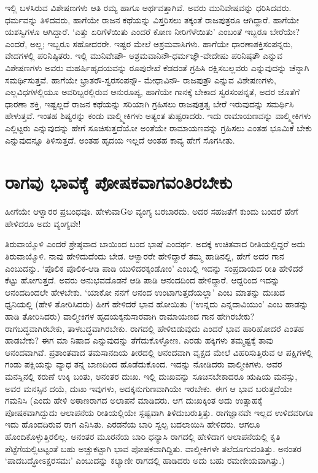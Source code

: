 ಇಲ್ಲಿ ಬಳಸಿರುವ ವಿಶೇಷಣಗಳು ಆತಿ ರಮ್ಯ ಹಾಗೂ ಅರ್ಥವತ್ತಾಗಿವೆ. ಅವರು ಮುನಿವೇಷವನ್ನು ಧರಿಸಿದವರು. ಧರ್ಮವನ್ನು ತಿಳಿದವರು, ಹಾಗೆಯೇ ರಾಜನ ಕಥೆಯನ್ನು ವಿಸ್ತರಿಸಲು ತಕ್ಕಂತೆ ರಾಜಪುತ್ರರೂ ಆಗಿದ್ದಾರೆ. ಹಾಗೆಯೇ ಯಶಸ್ವಿಗಳೂ ಆಗಿದ್ದಾರೆ. `ಎತ್ತು ಏರಿಗೆಳೆಯಿತು ಎಂದರೆ ಕೋಣ ನೀರಿಗೆಳೆಯಿತು' ಎಂಬಂತೆ ಇಬ್ಬರೂ ಬೇರೆಯೇ? ಎಂದರೆ, ಅಲ್ಲ; ಇಬ್ಬರೂ ಸಹೋದರರೇ. ಇಷ್ಟರ ಮೇಲೆ ಅಶ್ರಮವಾಸಿಗಳು. ಹಾಗೆಯೇ ಧಾರಣಾಶಕ್ತಿಸಂಪನ್ನರು, ವೇದಗಳಲ್ಲಿ ಪರಿನಿಷ್ಠಿತರು. ಇಲ್ಲಿ ಮುನಿವೇಷೌ- ಆಶ್ರಮವಾನಿನೌ-ಧರ್ಮಜ್ಞೌ-ವೇದೇಷು ಪರಿನಿಷ್ಠತೌ ಎನ್ನುವ ವಿಶೇಷಣಗಳು ಅವರು ಮಹರ್ಷಿಹೃದಯವನ್ನು ರೂಪುರೇಖೆ ಕೆಡದಂತೆ ಗ್ರಹಿಸಿ ರಕ್ಷಿಸಬಲ್ಲವರು ಎನ್ನುವುದನ್ನು ಚೆನ್ನಾಗಿ ಸಮರ್ಥಿಸುತ್ತವೆ. ಹಾಗೆಯೇ ಭ್ರಾತರೌ-ಸ್ವರಸಂಪನ್ನೌ- ಮೇಧಾವಿನೌ- ರಾಜಪುತ್ರೌ ಎನ್ನುವ ವಿಶೇಷಣಗಳು, ಎಲ್ಲವಿಧಗಳಲ್ಲಿಯೂ ಅವರಿಬ್ಬರಲ್ಲಿರುವ ಆನುರೂಪ್ಯ, ಹಾಗೆಯೇ ಗಾನಕ್ಕೆ ಬೇಕಾದ ಸ್ವರಸಂಪನ್ನತೆ, ಅದರ ಜೊತೆಗೆ ಧಾರಣಾ ಶಕ್ತಿ, ಇಷ್ಟಲ್ಲದೆ ರಾಜನ ಕಥೆಯನ್ನು ಸರಿಯಾಗಿ ಗ್ರಹಿಸಲು ರಾಜಪುತ್ರತ್ವ ಬೇರೆ ಇರುವುದನ್ನು ಸಮರ್ಥಿಸಿ ಹೇಳುತ್ತವೆ. ಇಂತಹ ಶಿಷ್ಯರನ್ನು ಕಂಡು ವಾಲ್ಮ್ಮೀಕಿಗಳು ಅತ್ಯಂತ ತುಷ್ಟರಾದರು. ಇದು ರಾಮಾಯಣವನ್ನು  ವಾಲ್ಮ್ಮೀಕಿಗಳು ಎಲ್ಲಿಟ್ಟರು ಎನ್ನುವುದನ್ನು ಹೇಗೆ ಸೂಚಿಸುತ್ತದೆಯೋ ಅಂತೆಯೇ ರಾಮಾಯಣವನ್ನು ಗ್ರಹಿಸಲು ಎಂತಹ ಭೂಮಿಕೆ ಬೇಕು ಎನ್ನುವುದನ್ನೂ ತಿಳಿಸುತ್ತದೆ. ಅಂತಹ ಹೃದಯ ಇಲ್ಲದೆ ಅಂತಹ ಕಾವ್ಯ ಹೇಗೆ ಸೊಗಸೀತು. 

\section*{ರಾಗವು ಭಾವಕ್ಕೆ ಪೋಷಕವಾಗವಂತಿರಬೇಕು}

ಹೀಗೆಯೇ ಆಳ್ವಾರರ ಪ್ರಬಂಧವೂ. ಹೇಳುವಾGಅ ವ್ಯಂಗ್ಯ ಬರಬಾರದು. ಅದರ ಸಹಜತೆಗೆ ಕುಂದು ಬಂದರೆ ಹೇಗೆ ಹೇಳಿದರೂ ಅದು ವ್ಯಂಗ್ಯವೇ!

ತಿರುವಾಯ್ಮೊಳಿ ಎಂದರೆ ಶ್ರೇಷ್ಠವಾದ ಬಾಯಿಂದ ಬಂದ ಭಾಷೆ ಎಂದರ್ಥ. ಅದಕ್ಕೆ ಉಚಿತವಾದ ರೀತಿಯಲ್ಲಿದ್ದರೆ ಅದು ತಿರುವಾಯ್ಮೊಳಿ. ನಾವು ಹೇಳಿದುದೆಂದು ಬೇಡ. ಆಳ್ವಾರರೇ ಹೇಳಿದ್ದಾರೆ ತಮ್ಮ ಹಾಡಿನಲ್ಲಿ, ಹೇಗೆ ಅದರ ಗಾನ ಎಂಬುದನ್ನು. `ಪೊಲಿಕ ಪೊಲಿಕ-ಆಡಿ ಪಾಡಿ ಯುಳಿದರಕ್ಕಂಡೋಂ' ಎಂಬಲ್ಲಿ ಇದನ್ನು ಸಂಪ್ರದಾಯದ ರೀತಿ ಹೇಳಿದರೆ ಕೆಟ್ಟು ಹೋಗುತ್ತದೆ. ಅವರು ಅನುಭವದೊಡನೆ ಆಡಿ ಪಾಡಿ ಆನಂದದಿಂದ ಹೇಳಿದ್ದಾರೆ. ಆದ್ದರಿಂದ ಇದನ್ನು ಆನಂದದಿಂದಲೇ ಹೇಳಬೇಕು. `ಯಾಕೋ ನನಗೆ ಆನಂದ ಉಂಟಾಗುತ್ತದೆಯಲ್ಲಾ' ಎಂಬ ಮಾತನ್ನು ದುಃಖದ ಧ್ವನಿಯಲ್ಲಿ (ಹೇಳಿ ತೋರಿಸಿದರು) ಹೀಗೆ ಹೇಳಿದರೆ ಭಾವ ಹೋಯಿತು (`ಉನ್ನದು ಎನ್ನದಾವಿಯುಂ' ಎಂಬ ಹಾಡನ್ನು ಹಾಡಿ ತೋರಿಸಿದರು) ವಾಲ್ಮೀಕಿಗಳ ಹೃದಯಕ್ಕನುಸಾರವಾಗಿ ರಾಮಾಯಣದ ಗಾನ ಹೇಗಿರಬೇಕು? ರಾಗಬದ್ಧವಾಗಿರಬೇಕು, ತಾಳಬದ್ಧವಾಗಿರಬೇಕು. ರಾಗದಲ್ಲಿ ಹೇಳಿಬಿಡುವುದು ಎಂದರೆ ಭಾವ ಹಾರಿಹೋದರೆ ಎಂತಹ ಹಾಡಬೇಕು? ಈಗ ಮಾ ನಿಷಾದ ಎನ್ನುವುದನ್ನು ತೆಗೆದುಕೊಳ್ಳೋಣ. ಎರಡು ಹಕ್ಕಿಗಳು ತಮ್ಮಷ್ಟಕ್ಕೆ ತಾವು ಆನಂದವಾಗಿವೆ. ಪ್ರಶಾಂತವಾದ ತಮಸಾನದಿಯ ತೀರದಲ್ಲಿ ಆನಂದವಾಗಿ ವೃಕ್ಷದ ಮೇಲೆ ವಿಹರಿಸುತ್ತಿರುವ ಆ ಪಕ್ಷಿಗಳಲ್ಲಿ ಗಂಡು ಪಕ್ಷಿಯನ್ನು ವ್ಯಾಧ ತನ್ನ ಬಾಣದಿಂದ ಹೊಡೆದುಕೊಂದ. ಇದನ್ನು ನೋಡಿದರು ವಾಲ್ಮೀಕಿಗಳು. ಅವರ ಮನಸ್ಸಿನಲ್ಲಿ ಕರುಣೆ ಉಕ್ಕಿ ಬಂತು, ಅನಂತರ ದುಃಖ. ಇಲ್ಲಿ ದುಃಖವನ್ನು ಸೂಚಿಸಬೇಕಾದರೂ ಋಷಿಯ ಮನಸ್ಸು, ಅವರ ಮನಸ್ಸಿನ ದಯೆ, ದುಃಖ ಇವುಗಳು, ಅದಕ್ಕನುಗುಣವಾಗಿಯೇ ಇರಬೇಕು. ಈಗ ಆ ಭಾವ ಬರುತ್ತದೆಯೇ ಗಮನಿಸಿ (ಎಂದು ಹೇಳಿ ಅಠಾಣರಾಗದ ಅಲಾಪನೆ ಮಾಡಿದರು. ಆಗ ದುಃಖಕ್ಕಿಂತ ಅದು ಉತ್ಸಾಹಕ್ಕೆ ಪೋಷಕವಾಗಿದ್ದುದು ಆಲಾಪನೆಯ ರೀತಿಯಲ್ಲಿಯೇ ಸ್ಪಷ್ಟವಾಗಿ ತಿಳಿದುಬರುತ್ತಿತ್ತು. ರಾಗಜ್ಞಾನವೇ ಇಲ್ಲದ ಉಳಿದವರಿಗೂ ಇದು ಹೊಂದದಿರುವ ರಾಗ ಎನಿಸಿತು. ಎರಡನೆಯ ಬಾರಿ ಸ್ವಲ್ಪ ಬದಲಾಯಿಸಿ ಹೇಳಿದರು. ಆಗಲೂ ಹೊಂದಿಕೊಳ್ಳುತ್ತಿರಲಿಲ್ಲ. ಅನಂತರ ಮೂರನೆಯ ಬಾರಿ ಧನ್ಯಾಸಿ ರಾಗದಲ್ಲಿ ಹೇಳಿದಾಗ ಆಲಾಪನೆಯಲ್ಲಿ ಕೃತಿ ಪೆಟ್ಟೆಗೆಯಲ್ಲಿಟಟ್ಟಂತೆ ಬಹು ಅಚ್ಚುಕಟ್ಟಾಗಿ ಭಾವ ಪೋಷಕವಾಗಿದ್ದಿತು. ವಾಲ್ಮೀಕಿಗಳೇ ತಲೆದೂಗುವಂತಿತ್ತು. ಅನಂತರ `ಪಾದಬದ್ಧೋಽಕ್ಷರಸಮಃ' ಎಂಬುದನ್ನು ಕಲ್ಯಾಣೀ ರಾಗದಲ್ಲಿ ಹಾಡಿದರು ಅದು ಬಹು ರಮಣೀಯವಾಗಿತ್ತು.)


